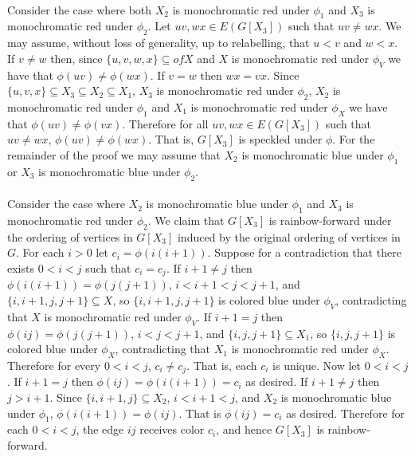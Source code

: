 \documentclass[letterpaper,12pt,oneside,onecolumn]{article}
\begin{document}
\paragraph{}
Consider the case where both $X_2$ is monochromatic red under $\phi_1$ and $X_3$ is monochromatic red under $\phi_2$. Let $uv,wx \in E(G[X_3])$ such that $uv \neq wx$. We may assume, without loss of generality, up to relabelling, that $u<v$ and $w<x$. If $v \neq w$ then, since $\{u,v,w,x\} \subseteq of X$ and $X$ is monochromatic red under $\phi_V$ we have that $\phi(uv) \neq \phi(wx)$. If $v=w$ then $wx = vx$. Since $\{u,v,x\} \subseteq X_3 \subseteq X_2 \subseteq X_1$, $X_3$ is monochromatic red under $\phi_2$, $X_2$ is monochromatic red under $\phi_1$ and $X_1$ is monochromatic red under $\phi_X$ we have that $\phi(uv) \neq \phi(vx)$. Therefore for all $uv, wx \in E(G[X_3])$ such that $uv \neq wx$, $\phi(uv) \neq \phi(wx)$. That is, $G[X_3]$ is speckled under $\phi$. For the remainder of the proof we may assume that $X_2$ is monochromatic blue under $\phi_1$ or $X_3$ is monochromatic blue under $\phi_2$.
\paragraph{}
Consider the case where $X_2$ is monochromatic blue under $\phi_1$ and $X_3$ is monochromatic red under $\phi_2$. We claim that $G[X_3]$ is rainbow-forward under the ordering of vertices in $G[X_3]$ induced by the original ordering of vertices in $G$.  For each $i>0$ let $c_i = \phi(i(i+1))$. Suppose for a contradiction that there exists $0<i<j$ such that $c_i = c_j$. If $i+1 \neq j$ then $\phi(i(i+1)) = \phi(j(j+1))$, $i<i+1<j<j+1$, and $\{i,i+1,j,j+1\} \subseteq X$, so $\{i,i+1,j,j+1\}$ is colored blue under $\phi_V$, contradicting that $X$ is monochromatic red under $\phi_V$. If $i+1 = j$ then $\phi(ij) = \phi(j(j+1))$, $i<j<j+1$, and $\{i, j, j+1 \} \subseteq X_1$, so $\{i,j,j+1\}$ is colored blue under $\phi_X$, contradicting that $X_1$ is monochromatic red under $\phi_X$. Therefore for every $0<i<j$, $c_i \neq c_j$. That is, each $c_i$ is unique. Now let $0<i<j$. If $i+1=j$ then $\phi(ij) = \phi(i(i+1)) = c_i$ as desired. If $i+1 \neq j$ then $j > i+1$. Since $\{i,i+1,j\} \subseteq X_2$, $i<i+1<j$, and $X_2$ is monochromatic blue under $\phi_1$, $\phi(i(i+1)) = \phi(ij)$. That is $\phi(ij) = c_i$ as desired. Therefore for each $0<i<j$, the edge $ij$ receives color $c_i$, and hence $G[X_3]$ is rainbow-forward.
\end{document}
